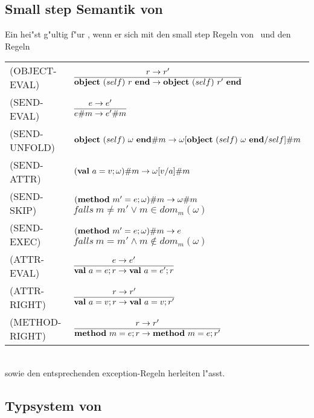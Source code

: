 \subsection{Small step Semantik von \LTWOO}

Ein  hei"st g"ultig f"ur \LTWOO, wenn er sich mit den small step Regeln von \LTWO\ und den Regeln\\[5mm]
  \begin{tabular}{ll}
    \mbox{(OBJECT-EVAL)}    & $\regel{r \to r'}
                                     {\object{self}{r} \to \object{self}{r'}}$ \\[5mm]
    \mbox{(SEND-EVAL)}      & $\regel{e \to e'}
                                     {\send{e}{m} \to \send{e'}{m}}$ \\[5mm]
    \mbox{(SEND-UNFOLD)}    & $\textbf{object}\ (self)\ \omega\ \textbf{end} \# m \to 
                               \omega [\textbf{object}\ (self)\ \omega\ \textbf{end}/self] \# m$ \\[3mm]
    \mbox{(SEND-ATTR)}      & $(\textbf{val}\ a=v;\omega) \# m \to \omega [v/a] \# m$ \\[3mm]
    \mbox{(SEND-SKIP)}      & $(\textbf{method}\ m'=e;\omega) \# m \to \omega \# m$ \ 
                              $falls\ m \neq m' \vee m \in dom_m(\omega)$ \\[3mm]
    \mbox{(SEND-EXEC)}      & $(\textbf{method}\ m'=e;\omega) \# m \to e$ \ 
                              $falls\ m = m' \wedge m \notin dom_m(\omega)$ \\[3mm]
    \mbox{(ATTR-EVAL)}      & $\regel{e \to e'}
                                     {\val{a}{e}r \to \val{a}{e'}r}$ \\[5mm]
    \mbox{(ATTR-RIGHT)}     & $\regel{r \to r'}
                                     {\val{a}{v}r \to \val{a}{v}r'}$ \\[5mm]
    \mbox{(METHOD-RIGHT)}   & $\regel{r \to r'}
                                     {\method{m}{e}r \to \method{m}{e}r'}$
  \end{tabular}\\[7mm]
sowie den entsprechenden exception-Regeln herleiten l"asst.


\subsection{Typsystem von \LTWOO}

